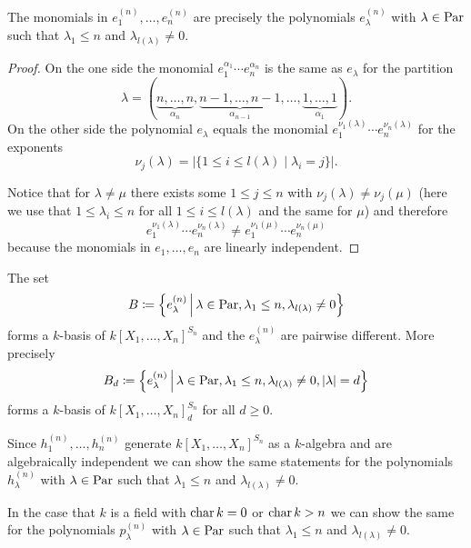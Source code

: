 \begin{proposition}
  The monomials in $e^{(n)}_1, \dotsc, e^{(n)}_n$ are precisely the polynomials $e^{(n)}_\lambda$ with $\lambda \in \operatorname{Par}$ such that $\lambda_1 \leq n$ and $\lambda_{l(\lambda)} \neq 0$.
\end{proposition}
\begin{proof}
  On the one side the monomial $e_1^{\alpha_1} \dotsm e_n^{\alpha_n}$ is the same as $e_\lambda$ for the partition
  \[
      \lambda
    = (
        \underbrace{n, \dotsc, n}_{\alpha_n},
        \underbrace{n-1, \dotsc, n-1}_{\alpha_{n-1}},
        \dotsc,
        \underbrace{1, \dotsc, 1}_{\alpha_1}
      ).
  \]
  On the other side the polynomial $e_\lambda$ equals the monomial $e_1^{\nu_1(\lambda)} \dotsm e_n^{\nu_n(\lambda)}$ for the exponents
  \[
      \nu_j(\lambda)
    = |
        \{
          1 \leq i \leq l(\lambda)
        \mid
          \lambda_i = j
        \}
      |.
  \]
  
  Notice that for $\lambda \neq \mu$ there exists some $1 \leq j \leq n$ with $\nu_j(\lambda) \neq \nu_j(\mu)$ (here we use that $1 \leq \lambda_i \leq n$ for all $1 \leq i \leq l(\lambda)$ and the same for $\mu$) and therefore
  \[
          e_1^{\nu_1(\lambda)} \dotsm e_n^{\nu_n(\lambda)}
    \neq  e_1^{\nu_1(\mu)} \dotsm e_n^{\nu_n(\mu)}
  \]
  because the monomials in $e_1, \dotsc, e_n$ are linearly independent.
\end{proof}


\begin{corollary}
  The set
  \[
              B
    \coloneqq \left\{
                e^{(n)}_\lambda
              \,\middle|\,
                \lambda \in \operatorname{Par},
                \lambda_1 \leq n,
                \lambda_{l(\lambda)} \neq 0
              \right\}
  \]
  forms a $k$-basis of $k[X_1, \dotsc, X_n]^{S_n}$ and the $e^{(n)}_\lambda$ are pairwise different.
  More precisely
  \[
              B_d
    \coloneqq \left\{
                e^{(n)}_\lambda
              \,\middle|\,
                \lambda \in \operatorname{Par},
                \lambda_1 \leq n,
                \lambda_{l(\lambda)} \neq 0,
                |\lambda| = d
              \right\}
  \]
  forms a $k$-basis of $k[X_1, \dotsc, X_n]^{S_n}_d$ for all $d \geq 0$.
\end{corollary}


\begin{remark}
  Since $h^{(n)}_1, \dotsc, h^{(n)}_n$ generate $k[X_1, \dotsc, X_n]^{S_n}$ as a $k$-algebra and are algebraically independent we can show the same statements for the polynomials $h^{(n)}_\lambda$ with $\lambda \in \operatorname{Par}$ such that $\lambda_1 \leq n$ and $\lambda_{l(\lambda)} \neq 0$.
  
  In the case that $k$ is a field with $\operatorname{char} k = 0$ or $\operatorname{char} k > n$ we can show the same for the polynomials $p^{(n)}_\lambda$ with $\lambda \in \operatorname{Par}$ such that $\lambda_1 \leq n$ and $\lambda_{l(\lambda)} \neq 0$.
\end{remark}



